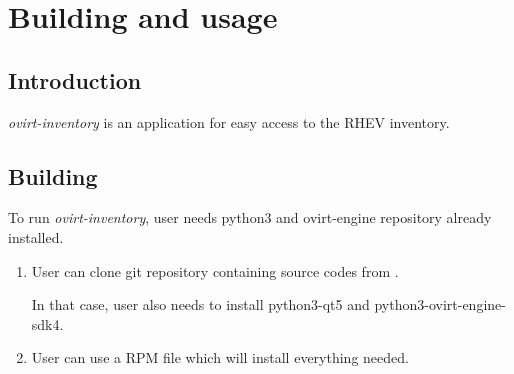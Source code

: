 





\chapter{Building and usage}

\section{Introduction}
\emph{ovirt-inventory} is an application for easy access to the RHEV inventory.

\section{Building}
To run \emph{ovirt-inventory}, user needs python3 and ovirt-engine repository already installed.

\begin{enumerate}
\item User can clone git repository containing source codes from \cite{git}.

In that case, user also needs to install python3-qt5 and python3-ovirt-engine-sdk4.
\item User can use a RPM file \cite{git} which will install everything needed.
\end{enumerate}

